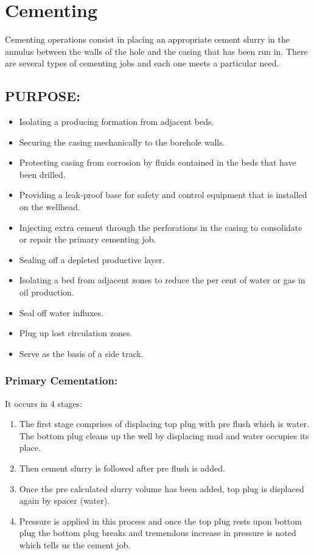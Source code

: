 \chapter{Cementing}
	
Cementing operations consist in placing an appropriate cement slurry in 
the annulus between the walls of the hole and the casing that has been run in.
There are several types of cementing jobs and each one meets a particular need.


\section*{PURPOSE:}

\begin{itemize}

\item Isolating a producing formation from adjacent beds.  
\item Securing the casing mechanically to the borehole walls.
\item Protecting casing from corrosion by fluids contained in the beds that have been drilled.
\item Providing a leak-proof base for safety and control equipment that is installed on the wellhead.
\item Injecting extra cement through the perforations in the casing to consolidate or repair the primary cementing job.
\item Sealing off a depleted productive layer.
\item Isolating a bed from adjacent zones to reduce the per cent of water or gas in oil production.
\item Seal off water influxes.
\item Plug up lost circulation zones.
\item Serve as the basis of a side track.

\end{itemize}


\subsection*{Primary Cementation:}

It occurs in 4 stages:
\begin{enumerate}
\item The first stage comprises of displacing top plug with pre flush
which is water. The bottom plug cleans up the well by
displacing mud and water occupies its place.

\item Then cement slurry is followed after pre flush is added.

\item Once the pre calculated slurry volume has been added, top plug
is displaced again by spacer (water).

\item Pressure is applied in this process and once the top plug rests
upon bottom plug the bottom plug breaks and tremendous
increase in pressure is noted which tells us the cement job.
\end{enumerate}


